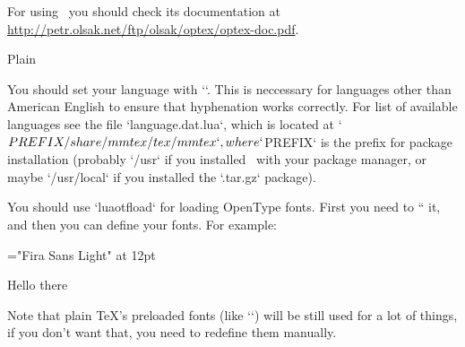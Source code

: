 For using \OpTeX\ you should check its documentation at
\url{http://petr.olsak.net/ftp/olsak/optex/optex-doc.pdf}.

\secc Plain \LuaTeX

You should set your language with ``. This is
neccessary for languages other than American English to ensure that hyphenation
works correctly. For list of available languages see the file
`language.dat.lua`, which is located at `$PREFIX/share/mmtex/tex/mmtex`, where
`$PREFIX` is the prefix for package installation (probably `/usr` if you
installed \MMTeX\ with your package manager, or maybe `/usr/local` if you
installed the `.tar.gz` package).

You should use `luaotfload` for loading OpenType fonts. First you need to
`` it, and then you can define your fonts. For example:

\begtt


\font\mainfont="Fira Sans Light" at 12pt
\mainfont

Hello there
\bye
\endtt

Note that plain \TeX's preloaded fonts (like `\tenrm`) will be still used for a
lot of things, if you don't want that, you need to redefine them manually.

\bye
